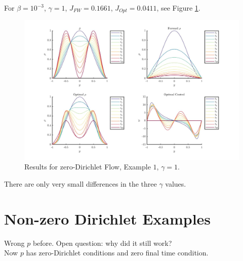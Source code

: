 \documentclass[11pt, a4paper]{article}
\theoremstyle{definition}
\begin{document}
For $\beta = 10^{-3}$, $\gamma = 1$, $J_{FW} = 0.1661$, $J_{Opt} = 0.0411$, see Figure \ref{ResD01b}.
\begin{figure}[h]
	\includegraphics[scale=0.3]{ResD01b.jpg}
	\caption{Results for zero-Dirichlet Flow, Example $1$, $\gamma = 1$.}
	\label{ResD01b}
\end{figure}
There are only very small differences in the three $\gamma$ values.



\section{Non-zero Dirichlet Examples}
Wrong $p$ before. Open question: why did it still work?\\
Now $p$ has zero-Dirichlet conditions and zero final time condition.
\end{document}
